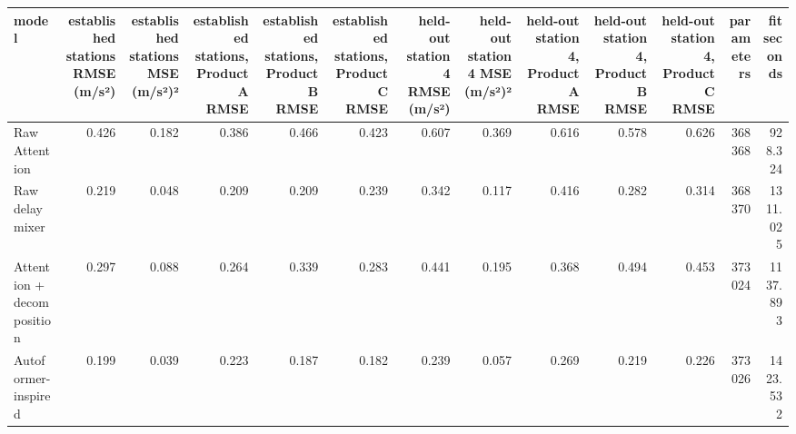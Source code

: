 \begin{tabular}{lrrrrrrrrrrrr}
\toprule
model & established stations RMSE (m/s²) & established stations MSE (m/s²)² & established stations, Product A RMSE & established stations, Product B RMSE & established stations, Product C RMSE & held-out station 4 RMSE (m/s²) & held-out station 4 MSE (m/s²)² & held-out station 4, Product A RMSE & held-out station 4, Product B RMSE & held-out station 4, Product C RMSE & parameters & fit seconds \\
\midrule
Raw Attention & 0.426 & 0.182 & 0.386 & 0.466 & 0.423 & 0.607 & 0.369 & 0.616 & 0.578 & 0.626 & 368368 & 928.324 \\
Raw delay mixer & 0.219 & 0.048 & 0.209 & 0.209 & 0.239 & 0.342 & 0.117 & 0.416 & 0.282 & 0.314 & 368370 & 1311.025 \\
Attention + decomposition & 0.297 & 0.088 & 0.264 & 0.339 & 0.283 & 0.441 & 0.195 & 0.368 & 0.494 & 0.453 & 373024 & 1137.893 \\
Autoformer-inspired & 0.199 & 0.039 & 0.223 & 0.187 & 0.182 & 0.239 & 0.057 & 0.269 & 0.219 & 0.226 & 373026 & 1423.532 \\
\bottomrule
\end{tabular}
